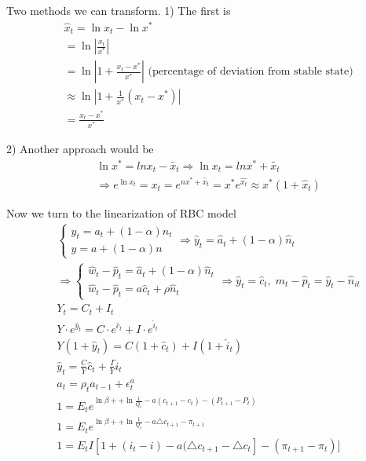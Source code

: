 \documentclass{article}
\begin{document}
Two methods we can transform. 
1) The first is 
\begin{align}
&
\hat x_{t}=\ln x_{t}-\ln x^{*}
\\&
=\ln |\frac{ x_{t}}{x^{*}}| 
\\&
=\ln |1+ \frac{x_{t}-x^{*}}{x^{*}}| \text{ (percentage of deviation from stable state)}
\\&
\approx \ln |1+\frac{1}{x^{*}}(x_{t}-x^{*})|
\\&
=\frac{x_{t}-x^{*}}{x^{*}}
\end{align}

2) Another approach would be
\begin{align}
&\ln x^{*}=ln x_{t}-\tilde{x_{t}}\Rightarrow \ln x_{t}=ln x^{*}+\tilde{x_{t}}
\\&
\Rightarrow e^{\ln x_{t}}=x_{t}=e^{n x^{*}+\tilde{x_{t}}}=x^{*}e^{\hat{x_{t}}} \approx x^{*} (1+\hat x_{t})
\end{align}

Now we turn to the linearization of RBC model
\begin{align}
&
\begin{cases}
y_{t}=a_{t}+(1-\alpha)n_{t}
\\
y=a+(1-\alpha)n
\end{cases}
\Rightarrow \hat y_{t}=\hat a_{t}+(1-\alpha)\hat n_{t}
\\&
\Rightarrow 
\begin{cases}
\hat w_{t}-\hat p_{t}=\hat a_{t}+(1-\alpha)\hat n_{t} \\
\hat w_{t}-\hat p_{t}=a\hat c_{t}+\rho \hat n_{t}\end{cases}
\Rightarrow \hat y_{t}=\hat c_{t}, \; m_{t}-\hat p_{t}=\hat y_{t} -\hat n_{it}
\\&
Y_{t}=C_{t}+I_{t}
\\&
Y\cdot e^{\hat y_{t}}=C\cdot e^{\hat c_{t}}+I\cdot e^{\hat i_{t}}
\\&
Y(1+\hat y_{t})=C(1+\hat c_{t})+I(1+\hat i_{t})
\\&
\hat y_{t}=\frac{C}{Y}\hat c_{t}+ \frac{I}{Y} \hat i_{t}\\&
a_{t}=\rho_{t} a_{t-1}+\epsilon_{t}^{a}
\\&
1=E_{t} e^{\ln \beta + +\ln \frac{1}{Q_{t}}-a(c_{t+1}-c_{t})-(P_{t+1}-P_{t})}
\\&
1=E_{t} e^{\ln \beta + +\ln \frac{1}{Q_{t}}-a\triangle c_{t+1}-\pi_{t+1}}
\\&
1=E_{t} I[1+(i_{t}-i)-a(\triangle c_{t+1}-\triangle c_{t}]-(\pi_{t+1}-\pi_{t})]
\end{align}
\end{document}
